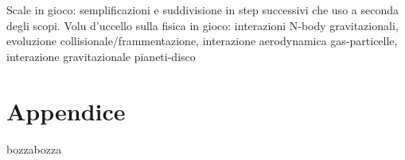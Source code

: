 \documentclass[twoside,11pt,fleqn]{memoir}%
\def\versione{bozza}%
\def\bozza{bozza}
\begin{document}
\begin{workout}
Scale in gioco: semplificazioni e suddivisione in step successivi che uso a seconda degli scopi.
Volu d'uccello sulla fisica in gioco: interazioni N-body gravitazionali, evoluzione collisionale/frammentazione, interazione aerodynamica gas-particelle, interazione gravitazionale pianeti-disco
\end{workout}



\cleartorecto




{\let\clearpage\relax\let\cleardoublepage\relax
\backmatter
}

\appendix
\part{Appendice}

\printbibliography
\ifx\versione\bozza
\erratac
\fi
\end{document}
